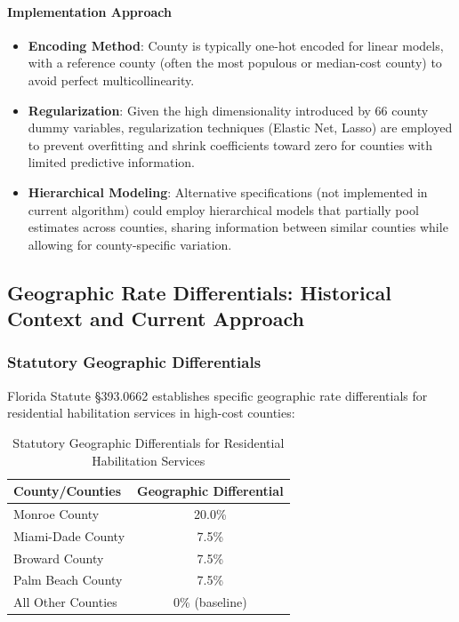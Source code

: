 \paragraph{Implementation Approach}
\begin{itemize}
    \item \textbf{Encoding Method}: County is typically one-hot encoded for linear models, with a reference county (often the most populous or median-cost county) to avoid perfect multicollinearity.
    
    \item \textbf{Regularization}: Given the high dimensionality introduced by 66 county dummy variables, regularization techniques (Elastic Net, Lasso) are employed to prevent overfitting and shrink coefficients toward zero for counties with limited predictive information.
    
    \item \textbf{Hierarchical Modeling}: Alternative specifications (not implemented in current algorithm) could employ hierarchical models that partially pool estimates across counties, sharing information between similar counties while allowing for county-specific variation.
\end{itemize}

\subsection{Geographic Rate Differentials: Historical Context and Current Approach}
\label{subsec:geographic-differentials}

\subsubsection{Statutory Geographic Differentials}

Florida Statute §393.0662 establishes specific geographic rate differentials for residential habilitation services in high-cost counties:

\begin{table}[H]
\centering
\caption{Statutory Geographic Differentials for Residential Habilitation Services}
\begin{tabular}{lc}
\toprule
\textbf{County/Counties} & \textbf{Geographic Differential} \\
\midrule
Monroe County & 20.0\% \\
Miami-Dade County & 7.5\% \\
Broward County & 7.5\% \\
Palm Beach County & 7.5\% \\
All Other Counties & 0\% (baseline) \\
\bottomrule
\end{tabular}
\label{tab:statutory-differentials}
\end{table}

